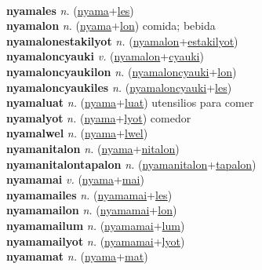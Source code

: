  \label{nyamaecsapulon} \\
\textbf{nyamales} \textit{n.} (\hyperref[nyama]{nyama}+\hyperref[les]{les})
 \label{nyamales} \\
\textbf{nyamalon} \textit{n.} (\hyperref[nyama]{nyama}+\hyperref[lon]{lon})
comida; bebida \label{nyamalon} \\
\textbf{nyamalonestakilyot} \textit{n.} (\hyperref[nyamalon]{nyamalon}+\hyperref[estakilyot]{estakilyot})
 \label{nyamalonestakilyot} \\
\textbf{nyamaloncyauki} \textit{v.} (\hyperref[nyamalon]{nyamalon}+\hyperref[cyauki]{cyauki})
 \label{nyamaloncyauki} \\
\textbf{nyamaloncyaukilon} \textit{n.} (\hyperref[nyamaloncyauki]{nyamaloncyauki}+\hyperref[lon]{lon})
 \label{nyamaloncyaukilon} \\
\textbf{nyamaloncyaukiles} \textit{n.} (\hyperref[nyamaloncyauki]{nyamaloncyauki}+\hyperref[les]{les})
 \label{nyamaloncyaukiles} \\
\textbf{nyamaluat} \textit{n.} (\hyperref[nyama]{nyama}+\hyperref[luat]{luat})
utensilios para comer \label{nyamaluat} \\
\textbf{nyamalyot} \textit{n.} (\hyperref[nyama]{nyama}+\hyperref[lyot]{lyot})
comedor \label{nyamalyot} \\
\textbf{nyamalwel} \textit{n.} (\hyperref[nyama]{nyama}+\hyperref[lwel]{lwel})
 \label{nyamalwel} \\
\textbf{nyamanitalon} \textit{n.} (\hyperref[nyama]{nyama}+\hyperref[nitalon]{nitalon})
 \label{nyamanitalon} \\
\textbf{nyamanitalontapalon} \textit{n.} (\hyperref[nyamanitalon]{nyamanitalon}+\hyperref[tapalon]{tapalon})
 \label{nyamanitalontapalon} \\
\textbf{nyamamai} \textit{v.} (\hyperref[nyama]{nyama}+\hyperref[mai]{mai})
 \label{nyamamai} \\
\textbf{nyamamailes} \textit{n.} (\hyperref[nyamamai]{nyamamai}+\hyperref[les]{les})
 \label{nyamamailes} \\
\textbf{nyamamailon} \textit{n.} (\hyperref[nyamamai]{nyamamai}+\hyperref[lon]{lon})
 \label{nyamamailon} \\
\textbf{nyamamailum} \textit{n.} (\hyperref[nyamamai]{nyamamai}+\hyperref[lum]{lum})
 \label{nyamamailum} \\
\textbf{nyamamailyot} \textit{n.} (\hyperref[nyamamai]{nyamamai}+\hyperref[lyot]{lyot})
 \label{nyamamailyot} \\
\textbf{nyamamat} \textit{n.} (\hyperref[nyama]{nyama}+\hyperref[mat]{mat})
